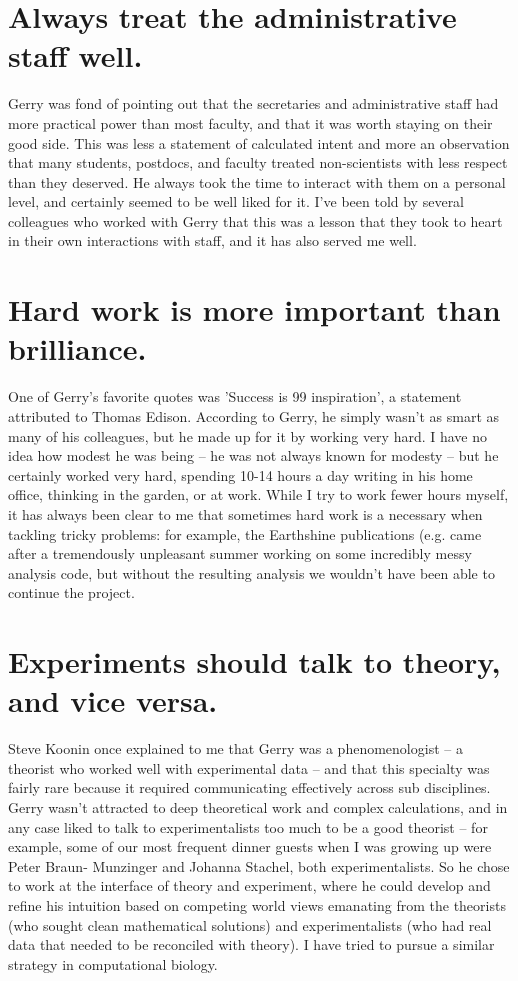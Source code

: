 \section*{Always treat the administrative staff well.}

Gerry was fond of pointing out that the secretaries and administrative
staff had more practical power than most faculty, and that it was
worth staying on their good side. This was less a statement of
calculated intent and more an observation that many students,
postdocs, and faculty treated non-scientists with less respect than
they deserved. He always took the time to interact with them on a
personal level, and certainly seemed to be well liked for it. I've
been told by several colleagues who worked with Gerry that this was a
lesson that they took to heart in their own interactions with staff,
and it has also served me well.

\section*{Hard work is more important than brilliance.}

One of Gerry's favorite quotes was 'Success is 99%
inspiration', a statement attributed to Thomas Edison. According to
Gerry, he simply wasn't as smart as many of his colleagues, but he
made up for it by working very hard. I have no idea how modest he was
being -- he was not always known for modesty -- but he certainly
worked very hard, spending 10-14 hours a day writing in his home
office, thinking in the garden, or at work. While I try to work fewer
hours myself, it has always been clear to me that sometimes hard work
is a necessary when tackling tricky problems: for example, the
Earthshine publications (e.g. \cite{goode2001earthshine} came after a
tremendously unpleasant summer working on some incredibly messy
analysis code, but without the resulting analysis we wouldn't have
been able to continue the project.

\section*{Experiments should talk to theory, and vice versa.}

Steve Koonin once explained to me that Gerry was a phenomenologist -- a
theorist who worked well with experimental data -- and that this
specialty was fairly rare because it required communicating
effectively across sub disciplines. Gerry wasn't attracted to deep
theoretical work and complex calculations, and in any case liked to
talk to experimentalists too much to be a good theorist -- for example,
some of our most frequent dinner guests when I was growing up were
Peter Braun- Munzinger and Johanna Stachel, both experimentalists. So
he chose to work at the interface of theory and experiment, where he
could develop and refine his intuition based on competing world views
emanating from the theorists (who sought clean mathematical solutions)
and experimentalists (who had real data that needed to be reconciled
with theory). I have tried to pursue a similar strategy in
computational biology.

